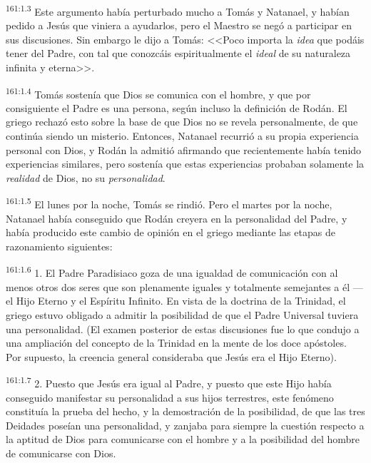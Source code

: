 \par 
\textsuperscript{161:1.3} Este argumento había perturbado mucho a Tomás y Natanael, y habían pedido a Jesús que viniera a ayudarlos, pero el Maestro se negó a participar en sus discusiones. Sin embargo le dijo a Tomás: <<Poco importa la \textit{idea} que podáis tener del Padre, con tal que conozcáis espiritualmente el \textit{ideal} de su naturaleza infinita y eterna>>.

\par 
\textsuperscript{161:1.4} Tomás sostenía que Dios se comunica con el hombre, y que por consiguiente el Padre es una persona, según incluso la definición de Rodán. El griego rechazó esto sobre la base de que Dios no se revela personalmente, de que continúa siendo un misterio. Entonces, Natanael recurrió a su propia experiencia personal con Dios, y Rodán la admitió afirmando que recientemente había tenido experiencias similares, pero sostenía que estas experiencias probaban solamente la \textit{realidad} de Dios, no su \textit{personalidad}.

\par 
\textsuperscript{161:1.5} El lunes por la noche, Tomás se rindió. Pero el martes por la noche, Natanael había conseguido que Rodán creyera en la personalidad del Padre, y había producido este cambio de opinión en el griego mediante las etapas de razonamiento siguientes:

\par 
\textsuperscript{161:1.6} 1. El Padre Paradisiaco goza de una igualdad de comunicación con al menos otros dos seres que son plenamente iguales y totalmente semejantes a él ---el Hijo Eterno y el Espíritu Infinito. En vista de la doctrina de la Trinidad, el griego estuvo obligado a admitir la posibilidad de que el Padre Universal tuviera una personalidad. (El examen posterior de estas discusiones fue lo que condujo a una ampliación del concepto de la Trinidad en la mente de los doce apóstoles. Por supuesto, la creencia general consideraba que Jesús era el Hijo Eterno).

\par 
\textsuperscript{161:1.7} 2. Puesto que Jesús era igual al Padre, y puesto que este Hijo había conseguido manifestar su personalidad a sus hijos terrestres, este fenómeno constituía la prueba del hecho, y la demostración de la posibilidad, de que las tres Deidades poseían una personalidad, y zanjaba para siempre la cuestión respecto a la aptitud de Dios para comunicarse con el hombre y a la posibilidad del hombre de comunicarse con Dios.

